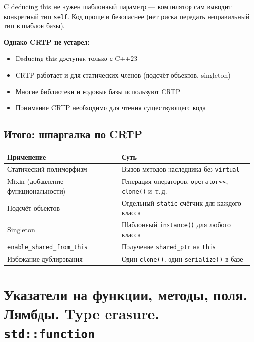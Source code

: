 \documentclass[a4paper,12pt]{article}
\begin{document}
C deducing this не нужен шаблонный параметр --- компилятор сам выводит
конкретный тип \texttt{self}. Код проще и безопаснее (нет риска передать
неправильный тип в шаблон базы).

\textbf{Однако CRTP не устарел:}
\begin{itemize}
    \item Deducing this доступен только с C++23
    \item CRTP работает и для статических членов (подсчёт объектов, singleton)
    \item Многие библиотеки и кодовые базы используют CRTP
    \item Понимание CRTP необходимо для чтения существующего кода
\end{itemize}

\subsection{Итого: шпаргалка по CRTP}

\begin{center}
\begin{tabular}{lp{9cm}}
\toprule
\textbf{Применение} & \textbf{Суть} \\
\midrule
Статический полиморфизм
    & Вызов методов наследника без \texttt{virtual} \\
\addlinespace
Mixin (добавление функциональности)
    & Генерация операторов, \texttt{operator<<}, \texttt{clone()} и~т.\,д. \\
\addlinespace
Подсчёт объектов
    & Отдельный \texttt{static} счётчик для каждого класса \\
\addlinespace
Singleton
    & Шаблонный \texttt{instance()} для любого класса \\
\addlinespace
\texttt{enable\_shared\_from\_this}
    & Получение \texttt{shared\_ptr} на \texttt{this} \\
\addlinespace
Избежание дублирования
    & Один \texttt{clone()}, один \texttt{serialize()} в базе \\
\bottomrule
\end{tabular}
\end{center}

\section{Указатели на функции, методы, поля. Лямбды. Type erasure. \texttt{std::function}}
\end{document}
